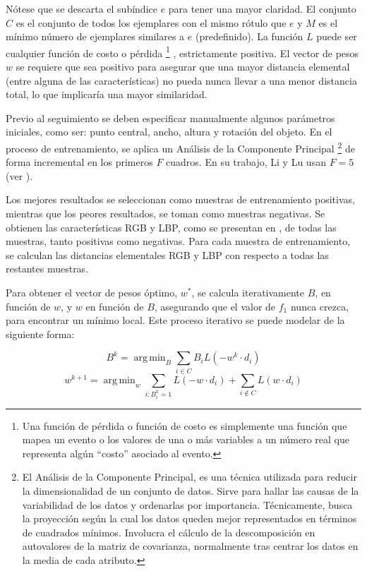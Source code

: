 \documentclass[a4paper,10pt]{article}
\DeclareMathOperator*{\argmin}{arg\,min}
\begin{document}
Nótese que se descarta el subíndice $e$ para tener una mayor claridad. El
conjunto $C$ es el conjunto de todos los ejemplares con el mismo rótulo que $e$
y $M$ es el mínimo número de ejemplares similares a $e$ (predefinido). La
función $L$ puede ser cualquier función de costo o pérdida \footnote{Una
función de pérdida o función de costo es simplemente una función que mapea un
evento o los valores de una o más variables a un número real que representa
algún ``costo'' asociado al evento.} , estrictamente positiva. El vector de
pesos $w$ se requiere que sea positivo para asegurar que una mayor distancia
elemental (entre alguna de las características) no pueda nunca llevar a una
menor distancia total, lo que implicaría una mayor similaridad.

Previo al seguimiento se deben especificar manualmente algunos parámetros iniciales,
como ser: punto central, ancho, altura y rotación del objeto. En el proceso de
entrenamiento, se aplica un Análisis de la Componente Principal
\footnote{El Análisis de la Componente Principal, es una técnica utilizada para reducir la dimensionalidad de un conjunto de datos.
Sirve para hallar las causas de la variabilidad de los datos y ordenarlas por importancia.
Técnicamente, busca la proyección según la cual los datos queden mejor representados en términos de cuadrados mínimos. Involucra el cálculo de la descomposición en
autovalores de la matriz de covarianza, normalmente tras centrar los datos en la media de cada atributo.}
de forma incremental en los primeros $F$ cuadros. En su trabajo, Li y Lu usan
$F = 5$ (ver \cite{local-learning}).

Los mejores resultados se seleccionan como muestras de entrenamiento positivas, mientras que
los peores resultados, se toman como muestras negativas. Se obtienen las características
RGB y LBP, como se presentan en \cite{tracking-bag-of-features}, de todas las muestras,
tanto positivas como negativas. Para cada muestra de entrenamiento, se calculan las
distancias elementales RGB y LBP con respecto a todas las restantes muestras.

Para obtener el vector de pesos óptimo, $w^{*}$, se calcula iterativamente $B$,
en función de $w$, y $w$ en función de $B$, asegurando que el valor de $f_{1}$ nunca
crezca, para encontrar un mínimo local. Este proceso iterativo se puede modelar de la
siguiente forma:

\begin{equation}
   \label{eq:local-learning-B-k}
   B^{k} = \argmin_{B} \sum_{i \in C} B_{i}L(-w^{k} \cdot d_{i})
\end{equation}
\begin{equation}
    \label{eq:local-learning-w-k}
    w^{k+1} = \argmin_{w} \sum_{i:B_{i}^{k}=1} L(-w \cdot d_{i}) + \sum_{i\notin C}L(w \cdot d_{i})
\end{equation}
\end{document}
